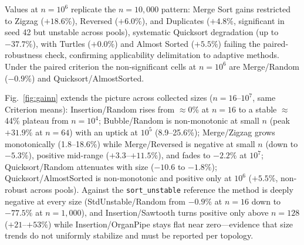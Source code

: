 \documentclass[namedate,webpdf,contemporary,large]{TBench-template}%
\theoremstyle{thmstyleone}%
\theoremstyle{thmstyletwo}%
\theoremstyle{thmstylethree}%
\begin{document}

\begin{table}[!t]
\caption{Mean time (ms) and preprocessing gain for 1,000,000-element vectors---quasilinear methods and standard baselines (quadratic omitted for temporal infeasibility). Source: Criterion, 50 samples, 95\% CI. Same paired-significance marks as Table~\ref{tab:times}; rows below the rule are the new topologies (Real excluded by the native asset cap).\label{tab:times1M}}%

\end{table}

Values at $n{=}10^6$ replicate the $n{=}10{,}000$ pattern: Merge Sort gains restricted to Zigzag ($+18.6\%$), Reversed ($+6.0\%$), and Duplicates ($+4.8\%$, significant in seed 42 but unstable across pools), systematic Quicksort degradation (up to $-37.7\%$), with Turtles ($+0.0\%$) and Almost Sorted ($+5.5\%$) failing the paired-robustness check, confirming applicability delimitation to adaptive methods. Under the paired criterion the non-significant cells at $n{=}10^6$ are Merge/Random ($-0.9\%$) and Quicksort/AlmostSorted.

Fig.~\ref{fig:gainn} extends the picture across collected sizes ($n{=}16$--$10^7$, same Criterion means): Insertion/Random rises from $\approx$0\% at $n{=}16$ to a stable $\approx$44\% plateau from $n{=}10^4$; Bubble/Random is non-monotonic at small $n$ (peak $+31.9\%$ at $n{=}64$) with an uptick at $10^5$ (8.9--25.6\%); Merge/Zigzag grows monotonically (1.8--18.6\%) while Merge/Reversed is negative at small $n$ (down to $-5.3\%$), positive mid-range ($+3.3$--$+11.5\%$), and fades to $-2.2\%$ at $10^7$; Quicksort/Random attenuates with size ($-10.6$ to $-1.8\%$); Quicksort/AlmostSorted is non-monotonic and positive only at $10^6$ ($+5.5\%$, non-robust across pools). Against the \texttt{sort\_unstable} reference the method is deeply negative at every size (StdUnstable/Random from $-0.9\%$ at $n{=}16$ down to $-77.5\%$ at $n{=}1{,}000$), and Insertion/Sawtooth turns positive only above $n{=}128$ ($+21$--$+53\%$) while Insertion/OrganPipe stays flat near zero---evidence that size trends do not uniformly stabilize and must be reported per topology.
\end{document}
